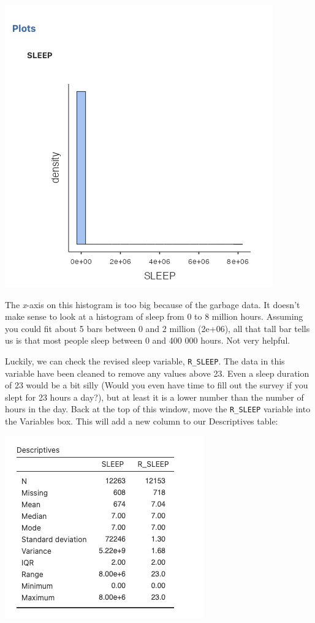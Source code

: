 \documentclass[
]{book}
\begin{document}
\includegraphics{img/Sleephistogram.png}

The \emph{x}-axis on this histogram is too big because of the garbage data. It doesn't make sense to look at a histogram of sleep from 0 to 8 million hours. Assuming you could fit about 5 bars between 0 and 2 million (2e+06), all that tall bar tells us is that most people sleep between 0 and 400 000 hours. Not very helpful.

Luckily, we can check the revised sleep variable, \texttt{R\_SLEEP}. The data in this variable have been cleaned to remove any values above 23. Even a sleep duration of 23 would be a bit silly (Would you even have time to fill out the survey if you slept for 23 hours a day?), but at least it is a lower number than the number of hours in the day. Back at the top of this window, move the \texttt{R\_SLEEP} variable into the Variables box. This will add a new column to our Descriptives table:

\includegraphics{img/sleepr_sleepdescriptives.png}
\end{document}
